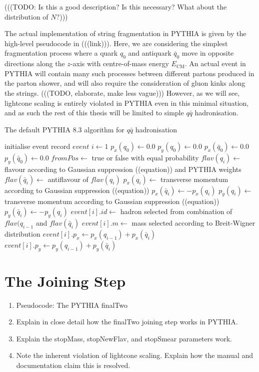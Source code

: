 \documentclass[12pt,a4paper]{report}
\begin{document}
(((TODO: Is this a good description? Is this necessary? What about the distribution of $N$?)))

The actual implementation of string fragmentation in PYTHIA is given by the high-level pseudocode in (((link))). Here, we are considering the simplest fragmentation process where a quark $q_0$ and antiquark $\bar{q}_0$ move in opposite directions along the $z$-axis with centre-of-mass energy $E_\text{CM}$. An actual event in PYTHIA will contain many such processes between different partons produced in the parton shower, and will also require the consideration of gluon kinks along the strings. (((TODO, elaborate, make less vague))) However, as we will see, lightcone scaling is entirely violated in PYTHIA even in this minimal situation, and as such the rest of this thesis will be limited to simple $q \bar{q}$ hadronisation.

\begin{algorithm}
  \caption{The default PYTHIA 8.3 algorithm for $q\bar{q}$ hadronisation} \label{alg:default}
  \begin{algorithmic}
    \State initialise event record $event$
    \State $i \gets 1$
    \State $p_x(q_0) \gets 0.0$
    \State $p_y(q_0) \gets 0.0$
    \State $p_x(\bar{q}_0) \gets 0.0$
    \State $p_y(\bar{q}_0) \gets 0.0$
    \Loop
    \State $fromPos \gets$ true or false with equal probability
    \State $flav(q_i) \gets$ flavour according to Gaussian suppression ((equation)) and PYTHIA weights
    \State $flav(\bar{q}_i) \gets$ antiflavour of $flav(q_i)$
    \State $p_x(q_i) \gets$ transverse momentum according to Gaussian suppression ((equation))
    \State $p_x(\bar{q}_i) \gets -p_x(q_i)$
    \State $p_y(q_i) \gets$ transverse momentum according to Gaussian suppression ((equation))
    \State $p_y(\bar{q}_i) \gets -p_y(q_i)$ 
    \State $event[i].id \gets$ hadron selected from combination of $flav(q_{i-1}$ and $flav(\bar{q}_i)$
    \State $event[i].m \gets$ mass selected according to Breit-Wigner distribution
    \State $event[i].p_x \gets p_x(q_{i-1}) + p_x(\bar{q}_i)$
    \State $event[i].p_y \gets p_y(q_{i-1}) + p_y(\bar{q}_i)$
    \Else
    \EndIf
    \EndLoop
    \EndProcedure
  \end{algorithmic}
\end{algorithm}

\section{The Joining Step}
\begin{enumerate}
\item Pseudocode: The PYTHIA finalTwo
\item Explain in close detail how the finalTwo joining step works in PYTHIA.
\item Explain the stopMass, stopNewFlav, and stopSmear parameters work.
\item Note the inherent violation of lightcone scaling. Explain how the manual and documentation claim this is resolved.
\end{enumerate}
\end{document}
